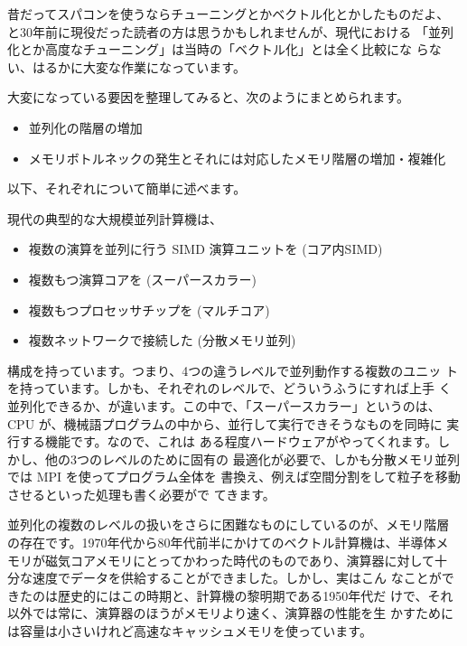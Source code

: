\documentclass[twocolumn,10pt]{jarticle}
\begin{document}
昔だってスパコンを使うならチューニングとかベクトル化とかしたものだよ、
と30年前に現役だった読者の方は思うかもしれませんが、現代における
「並列化とか高度なチューニング」は当時の「ベクトル化」とは全く比較にな
らない、はるかに大変な作業になっています。

大変になっている要因を整理してみると、次のようにまとめられます。

\begin{itemize}

\item 並列化の階層の増加

\item メモリボトルネックの発生とそれには対応したメモリ階層の増加・複雑化

  
\end{itemize}  

以下、それぞれについて簡単に述べます。

現代の典型的な大規模並列計算機は、

\begin{itemize}

\item 複数の演算を並列に行う SIMD 演算ユニットを (コア内SIMD)
\item 複数もつ演算コアを (スーパースカラー)
\item 複数もつプロセッサチップを (マルチコア)
\item 複数ネットワークで接続した (分散メモリ並列)

\end{itemize}  
構成を持っています。つまり、4つの違うレベルで並列動作する複数のユニッ
トを持っています。しかも、それぞれのレベルで、どういうふうにすれば上手
く並列化できるか、が違います。この中で、「スーパースカラー」というのは、
CPU が、機械語プログラムの中から、並行して実行できそうなものを同時に
実行する機能です。なので、これは
ある程度ハードウェアがやってくれます。しかし、他の3つのレベルのために固有の
最適化が必要で、しかも分散メモリ並列では MPI を使ってプログラム全体を
書換え、例えば空間分割をして粒子を移動させるといった処理も書く必要がで
てきます。

並列化の複数のレベルの扱いをさらに困難なものにしているのが、メモリ階層
の存在です。1970年代から80年代前半にかけてのベクトル計算機は、半導体メ
モリが磁気コアメモリにとってかわった時代のものであり、演算器に対して十
分な速度でデータを供給することができました。しかし、実はこん
なことができたのは歴史的にはこの時期と、計算機の黎明期である1950年代だ
けで、それ以外では常に、演算器のほうがメモリより速く、演算器の性能を生
かすためには容量は小さいけれど高速なキャッシュメモリを使っています。
\end{document}
